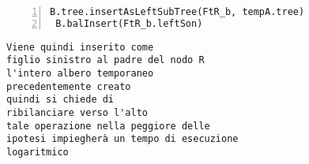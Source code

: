  \begin{minipage}{0.5\linewidth}
 \begin{Verbatim}[frame=topline,numbers=left,label=Codice,framesep=5mm]
 B.tree.insertAsLeftSubTree(FtR_b, tempA.tree)
 B.balInsert(FtR_b.leftSon)
  \end{Verbatim}
\end{minipage}\hfill
\begin{minipage}{0.39\linewidth}
\begin{Verbatim}
Viene quindi inserito come 
figlio sinistro al padre del nodo R
l'intero albero temporaneo 
precedentemente creato
quindi si chiede di 
ribilanciare verso l'alto
tale operazione nella peggiore delle
ipotesi impiegherà un tempo di esecuzione
logaritmico
\end{Verbatim}
\end{minipage}
\newline
\newline